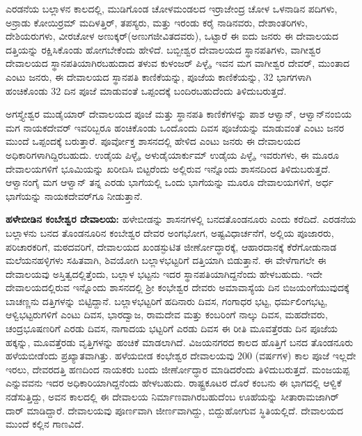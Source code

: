 ಎರಡನೆಯ ಬಲ್ಲಾಳನ ಕಾಲದಲ್ಲಿ, ಮುಡಿಗೊಂಡ ಚೋಳಮಂಡಲದ ಇರ್ರಾಜೇಂದ್ರ ಚೋಳ ಒಳನಾಡಿನ ಪದಿಗಳು, ಅನ್ರಾಡು ಕೋಯಿರ್ರಮ್ ಮದಿಳತ್ತಿರ್​, ತಪಸ್ಯರು, ಮತ್ತು ಇರಂಡು ಕರೈ ನಾಡಿನವರು, ದೇಶಾಂತರಿಗಳು, ದೇಶಿಯರುಗಳು, ವೀರಚೋಳ ಅಣುಕ್ಕರ್​(ಅಣುಗಜೀವಿತದವರು), ಒಟ್ಟಾರೆ ಈ ಐದು ಜನರು ಈ ದೇವಾಲಯದ ದತ್ತಿಯನ್ನು ರಕ್ಷಿಸಿಕೊಂಡು ಹೋಗಬೇಕೆಂದು ಹೇಳಿದೆ. ಬಬ್ಬೀಶ್ವರ ದೇವಾಲಯದ ಸ್ಥಾನಪತಿಗಳು, ವಾಗೀಶ್ವರ ದೇವಾಲಯದ ಸ್ಥಾನಪತಿಯಾಗಿರಬಹುದಾದ ತಳುವ ಕುಳಂಜರ್​ ಪಿಳ್ಳೈ, ಇವನ ಮಗ ವಾಗೀಶ್ವರ ದೇವರ್​, ಮುಂತಾದ ಎಂಟು ಜನರು, ಈ ದೇವಾಲಯದ ಸ್ಥಾನಪತಿ ಕಾಣಿಕೆಯನ್ನು, ಪೂಜೆಯ ಕಾಣಿಕೆಯನ್ನು, 32 ಭಾಗಗಳಾಗಿ ಹಂಚಿಕೊಂಡು 32 ದಿನ ಪೂಜೆ ಮಾಡುವಂತೆ ಒಪ್ಪಂದಕ್ಕೆ ಬಂದಿರಬಹುದೆಂದು ತಿಳಿದುಬರುತ್ತದೆ.

ಅಗಸ್ತ್ಯೇಶ್ವರ ಮುಡೈಯಾರ್​ ದೇವಾಲಯದ ಪೂಜೆ ಮತ್ತು ಸ್ಥಾನಪತಿ ಕಾಣಿಕೆಗಳನ್ನು ಪಾಶ ಆಳ್ವಾನ್​, ಆಳ್ವಾನ್​ ನಂಬಿಯ ಮಗ ನಾಯಕದೇವರ್​ ಇವರಿಬ್ಬರೂ ಹಂಚಿಕೊಂಡು ಒಂದೊಂದು ದಿವಸ ಪೂಜೆಯನ್ನು ಮಾಡುವಂತೆ ಎಂಟು ಜನರ ಮುಂದೆ ಒಪ್ಪಂದಕ್ಕೆ ಬರುತ್ತಾರೆ. ಪೂರ್ವೋಕ್ತ ಶಾಸನದಲ್ಲಿ ಹೇಳಿದ ಎಂಟು ಜನರು ಈ ದೇವಾಲಯದ ಅಧಿಕಾರಿಗಳಾಗಿದ್ದಿರಬಹುದು. ಉಡೈಯ ಪಿಳ್ಳೈ, ಅಳುಡೈಯಾರ್ಕುಮ್ ಉಡೈಯ ಪಿಳ್ಳೈ, ಇವರುಗಳು, ಈ ಮೂರೂ ದೇವಾಲಯಗಳಿಗೆ ಭೂಮಿಯನ್ನು ಖರೀದಿಸಿ ಬಿಟ್ಟರೆಂದು ಅಲ್ಲಿರುವ ಇನ್ನೊಂದು ಶಾಸನದಿಂದ ತಿಳಿದುಬರುತ್ತದೆ. ಆಳ್ವಾನಂಗೈ ಮಗ ಆಳ್ವಾನ್​ ತನ್ನ ಎರಡು ಭಾಗೆಯಲ್ಲಿ ಒಂದು ಭಾಗೆಯನ್ನು ಮೂರೂ ದೇವಾಲಯಗಳಿಗೆ, ಅರ್ಧ ಭಾಗೆಯನ್ನು ನಾಯಕದೇವರ್​ಗೂ ನೀಡುತ್ತಾನೆ.

\textbf{ಹಳೇಬೀಡಿನ ಕಂಬೇಶ್ವರ ದೇವಾಲಯ:} ಹಳೇಬೀಡನ್ನು ಶಾಸನಗಳಲ್ಲಿ ಬನದತೊಂಡನೂರು ಎಂದು ಕರೆದಿದೆ. ಎರಡನೆಯ ಬಲ್ಲಾಳನು ಬನದ ತೊಂಡನೂರಿನ ಕಂಬೇಶ್ವರ ದೇವರ ಅಂಗಭೋಗ, ಅಷ್ಟವಿಧಾರ್ಚನೆಗೆ, ಅಲ್ಲಿಯ ಪೂಜಾರರು, ಪರಿಚಾರಕರಿಗೆ, ಮಠದವರಿಗೆ, ದೇವಾಲಯದ ಖಂಡಸ್ಫುಟಿತ ಜೀರ್ಣೋದ್ಧಾರಕ್ಕೆ, ಆಹಾರದಾನಕ್ಕೆ ಕೆರೆಗೋಡುನಾಡ ಮಲೆಯನಹಳ್ಳಿಗಳು ಸಹಿತವಾಗಿ, ಶಿವಯೋಗಿ ಬಲ್ಲಾಳಭಟ್ಟರಿಗೆ ದತ್ತಿಯಾಗಿ ಬಿಡುತ್ತಾನೆ. ಈ ವೇಳೆಗಾಗಲೇ ಈ ದೇವಾಲಯವು ಅಸ್ತಿತ್ವದಲ್ಲಿತ್ತೆಂದು, ಬಲ್ಲಾಳ ಭಟ್ಟನು ಇದರ ಸ್ಥಾನಪತಿಯಾಗಿದ್ದನೆಂದು ಹೇಳಬಹುದು. ಇದೇ ದೇವಾಲಯದಲ್ಲಿರುವ ಇನ್ನೊಂದು ಶಾಸನದಲ್ಲಿ ಶ‍್ರೀ ಕಂಭೇಶ್ವರ ದೇವರು ಅಮಾವಾಸ್ಯೆಯ ದಿನ ಬಿಜಯಂಗೆಯುವುದಕ್ಕೆ ಬಾಚಣ್ಣನು ದತ್ತಿಗಳನ್ನು ಬಿಟ್ಟಿದ್ದಾನೆ. ಬಲ್ಲಾಳಭಟ್ಟರಿಗೆ ಹದಿನಾರು ದಿವಸ, ಗಂಗಾಧರ ಭಟ್ಟ, ಧರ್ಮಲಿಂಗಭಟ್ಟ, ಆಳ್ವಿಭಟ್ಟರುಗಳಿಗೆ ಎಂಟು ದಿವಸ, ಭಾರದ್ವಾಜ, ರಾಮದೇವ ಮತ್ತು ಕಂಬರಿಂಗೆ ನಾಲ್ಕು ದಿವಸ, ಮಹದೇವರು, ಚಂದ್ರಭೂಷಣರಿಗೆ ಎರಡು ದಿವಸ, ನಾಗಾದಯ ಭಟ್ಟರಿಗೆ ಎರಡು ದಿವಸ ಈ ರೀತಿ ಮೂವತ್ತೆರಡು ದಿನ ಪೂಜೆಯ ಹಕ್ಕನ್ನು, ಮೂವತ್ತೆರಡು ವೃತ್ತಿಗಳನ್ನು ಹಂಚಿಕೆ ಮಾಡಲಾಗಿದೆ. ವಿಜಯನಗರದ ಕಾಲದ ಹೊತ್ತಿಗೆ ಬನದ ತೊಂಡನೂರು ಹಳೆಯಬೀಡೆಂದು ಪ್ರಖ್ಯಾತವಾಗಿತ್ತು. ಹಳೆಯಬೀಡ ಕಂಭೇಶ್ವರ ದೇವಾಲಯವು 200 (ವರ್ಷಗಳ) ಕಾಲ ಪೂಜೆ ಇಲ್ಲದೇ ಇರಲು, ದೇವರದತ್ತಿ ಹಣದಿಂದ ನಾಯಕರು ಬಂದು ಜೀರ್ಣೋದ್ಧಾರ ಮಾಡಿದರೆಂದು ತಿಳಿದುಬರುತ್ತದೆ. ಮಂಜಯಪ್ಪ ಎನ್ನುವವನು ಇದರ ಅಧಿಕಾರಿಯಾಗಿದ್ದನೆಂದು ಹೇಳಬಹುದು. ರಾಷ್ಟ್ರಕೂಟರ ದೊರೆ ಕಂಬನು ಈ ಭಾಗದಲ್ಲಿ ಆಳ್ವಿಕೆ ನಡೆಸುತ್ತಿದ್ದು, ಅವನ ಕಾಲದಲ್ಲಿ ಈ ದೇವಾಲಯ ನಿರ್ಮಾಣವಾಗಿರಬಹುದೆಂಬ ಊಹೆಯನ್ನು ಸೀತಾರಾಮಜಾಗಿರ್​ದಾರ್​ ಮಾಡಿದ್ದಾರೆ. ದೇವಾಲಯವು ಪೂರ್ಣವಾಗಿ ಜೀರ್ಣವಾಗಿದ್ದು, ಬಿದ್ದುಹೋಗುವ ಸ್ಥಿತಿಯಲ್ಲಿದೆ. ದೇವಾಲಯದ ಮುಂದೆ ಕಲ್ಲಿನ ಗಾಣವಿದೆ.

